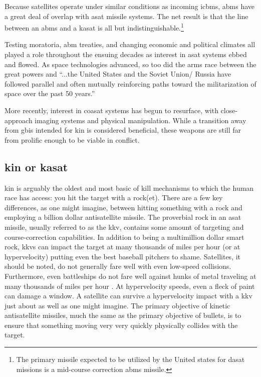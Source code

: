 Because satellites operate under similar conditions as incoming
\acp{icbm}, \acs{abms} have a great deal of overlap with \ac{asat}
missile systems.  The net result is that the line between an \ac{abms}
and a \ac{kasat} is all but indistinguishable.\footnote{The primary
missile expected to be utilized by the United states for \ac{dasat}
missions is a mid-course correction \ac{abms}
missile.\cite[p01-15]{brian}}

Testing moratoria\cite{xxx}, \ac{abm} treaties\cite{xxx}, and changing
economic\cite[boom]{xxx} and political\cite[fall of ussr]{xxx}
climates all played a role throughout the ensuing decades as interest
in \ac{asat} systems ebbed and flowed.\cite[xxx]{grego} As space
technologies advanced, so too did the arms race between the great
powers and ``...the United States and the Soviet Union/ Russia have
followed parallel and often mutually reinforcing paths toward the
militarization of space over the past 50 years.''\cite[p2]{grego}

More recently, interest in \ac{coasat} systems has begun to resurface,
with close-approach imaging systems \cite[the russian one maybe?]{xxx}
and physical manipulation.\cite[chinese one maybe?]{xxx} While a
transition away from \acp{gbi} intended for \ac{kin} is considered
beneficial, these weapons are still far from prolific enough to be
viable in conflict.

\subsection{\acf{kin} or \acf{kasat}}

\acl{kin} is arguably the oldest and most basic of kill mechanisms to
which the human race has access: you hit the target with a
rock(et). There are a few key differences, as one might imagine,
between hitting something with a rock and employing a billion dollar
antisatellite missile.  The proverbial rock in an \ac{asat} missile,
usually referred to as the \acf{kkv}, contains some amount of
targeting and course-correction capabilities.\cite{sm3} In addition to
being a multimillion dollar smart rock, \acp{kkv} can impact the
target at many thousands of miles per hour (or at hypervelocity)
putting even the best baseball pitchers to shame.\cite[kkv impact
  simulation]{xxx} Satellites, it should be noted, do not generally
fare well with even low-speed collisions.\cite{whoopsies} Furthermore,
even battleships do not fare well against hunks of metal traveling at
many thousands of miles per hour \cite[any hypersonic paper]{xxx}.  At
hypervelocity speeds, even a fleck of paint can damage a
window.\cite[iss window]{xxx} A satellite can survive a hypervelocity
impact with a \ac{kkv} just about as well as one might
imagine.\cite[hypervelocity impact simulation]{xxx} The primary
objective of kinetic antisatellite missiles, much the same as the
primary objective of bullets, is to ensure that something moving very
very quickly physically collides with the target.\cite[needed?]{xxx}

